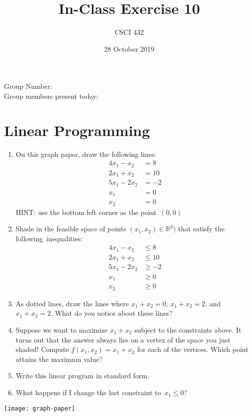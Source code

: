 \documentclass{article}
\title{In-Class Exercise 10}
\author{CSCI 432}
\date{28 October 2019}
\def\R{{\mathbb R}}
\begin{document}
\maketitle

\noindent
Group Number:\\
Group members present today:

\section*{Linear Programming}

\begin{multicols}{2}

\begin{enumerate}
    \item On this graph paper, draw the following lines:
        \begin{align}
            4x_1 - x_2 &= 8\\
            2x_1 + x_2 &= 10\\
            5x_1 -2x_2 &= -2 \\
            x_1 &= 0\\
            x_2 &= 0
        \end{align}
        HINT: use the bottom
        left corner as the point~$(0,0)$
    \item Shade in the feasible space of points $(x_1,x_2)\in \R^2)$ that
        satisfy the following~inequalities:
        \begin{align}
            4x_1 - x_2 &\leq 8\\
            2x_1 + x_2 &\leq 10\\
            5x_1 -2x_2 &\geq -2 \\
            x_1 &\geq 0\\
            x_2 &\geq 0
        \end{align}
    \item As dotted lines, draw the lines where $x_1+x_2=0$, $x_1+x_2=2$, and
        $x_1+x_2=2$.  What do you notice about these lines?
        \vspace{.75in}
    \item Suppose we want to maximize $x_1+x_2$ subject to the constraints
        above.  It turns out that the answer always lies on a vertex of the
        space you just shaded!  Compute $f(x_1,x_2)=x_1+x_2$ for each of the
        vertices. Which point attains the maximum value?
        \vspace{.75in}
    \item Write this linear program in standard form.\\
        \vspace{2in}
    \item What happens if I change the last constraint to~$x_1 \leq 0$?
\end{enumerate}

\end{multicols}

\texttt{[image: graph-paper]}
\end{document}
